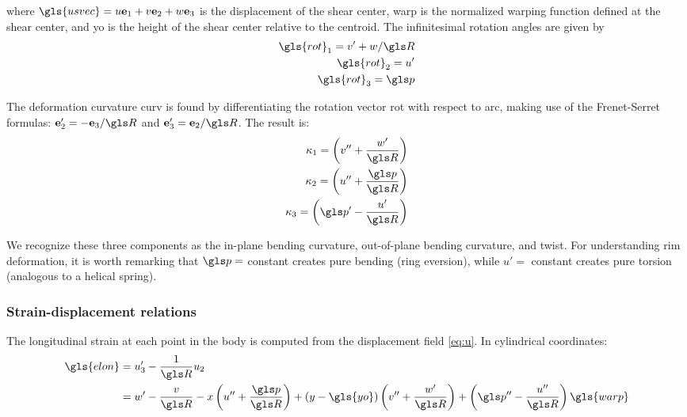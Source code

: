 \documentclass[\rootdir/thesis.tex]{subfiles}
\begin{document}
where $\gls{usvec} = u\eo + v\et + w\eh$ is the displacement of the shear center, \gls{warp} is the normalized warping function defined at the shear center, and \gls{yo} is the height of the shear center relative to the centroid. The infinitesimal rotation angles are given by
\begin{subequations}
\label{eq:omega}
\begin{align}
\gls{rot}_1 = v' + w/\R\\
\gls{rot}_2 = u'\\
\gls{rot}_3 = \p
\end{align}
\end{subequations}

The deformation curvature \gls{curv} is found by differentiating the rotation vector \gls{rot} with respect to \gls{arc}, making use of the Frenet-Serret formulas: $\et' = -\eh/\R$ and $\eh' = \et/\R$. The result is:
\begin{subequations}
\label{eq:kappa}
\begin{align}
\kappa_1 = \left( v'' + \frac{w'}{\R} \right) \label{eq:kappa1}\\
\kappa_2 = \left( u'' + \frac{\p}{\R} \right) \label{eq:kappa2}\\
\kappa_3 = \left( \p' - \frac{u'}{\R} \right) \label{eq:kappa3}
\end{align}
\end{subequations}

We recognize these three components as the in-plane bending curvature, out-of-plane bending curvature, and twist. For understanding rim deformation, it is worth remarking that $\p=$ constant creates pure bending (ring eversion), while $u'=$ constant creates pure torsion (analogous to a helical spring).

\subsubsection{Strain-displacement relations}

The longitudinal strain at each point in the body is computed from the displacement field \eqref{eq:u}. In cylindrical coordinates:
\begin{align}
\label{eq:strain}
\begin{split}
\gls{elon} &= u_3' - \frac{1}{\R} u_2\\
           &= w' - \frac{v}{\R} - \x\left(u'' + \frac{\p}{\R}\right) +
                 	(\y-\gls{yo})\left(v'' + \frac{w'}{\R}\right) +
                 	\left(\p'' - \frac{u''}{\R}\right)\gls{warp}
\end{split}
\end{align}
\end{document}

